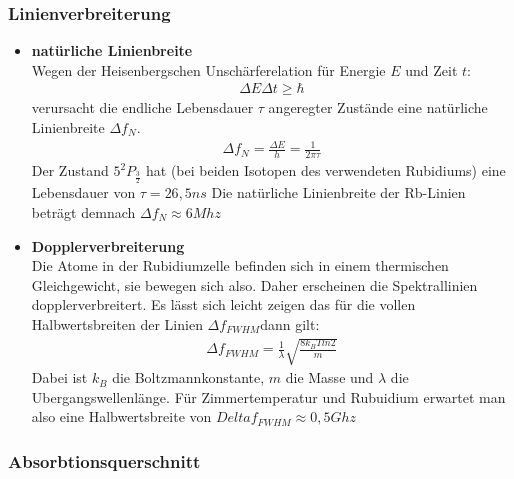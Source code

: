\documentclass[12pt]{article}
\begin{document}
\subsubsection{Linienverbreiterung}
\begin{itemize}
 \item \textbf{natürliche Linienbreite} \\
    Wegen der Heisenbergschen Unschärferelation für Energie $E$ und Zeit $t$:
    \begin{align*}
    \Delta E \Delta t \geq \hbar
    \end{align*}
    verursacht die endliche Lebensdauer $\tau$ angeregter Zustände eine natürliche Linienbreite $\Delta f_N$.
    \begin{align}
    \label{natbreite}
    \Delta f_N  = \frac{\Delta E}{h} = \frac{1}{2 \pi \tau}
    \end{align}
    Der Zustand $5^2P_{\frac{3}{2}}$ hat (bei beiden Isotopen des verwendeten Rubidiums) eine Lebensdauer von $\tau =26,5 ns$
    Die natürliche Linienbreite der Rb-Linien beträgt demnach $\Delta f_N \approx 6 Mhz$
 \item \textbf{Dopplerverbreiterung} \\
    Die Atome in der Rubidiumzelle befinden sich in einem thermischen Gleichgewicht, sie bewegen sich also. Daher erscheinen die Spektrallinien dopplerverbreitert. Es lässt sich leicht zeigen das für die vollen Halbwertsbreiten der Linien $\Delta f_{FWHM}$dann gilt:
    \begin{align}
    \label{FWHM}
     \Delta f_{FWHM} = \frac{1}{\lambda} \sqrt{\frac{8 k_B T ln 2}{m}}
    \end{align}
    Dabei ist $k_B$ die Boltzmannkonstante, $m$ die Masse und $\lambda$ die Ubergangswellenlänge.
Für Zimmertemperatur und Rubuidium erwartet man also eine Halbwertsbreite von $Delta f_{FWHM} \approx 0,5 Ghz$
\end{itemize}

\subsubsection{Absorbtionsquerschnitt}
\end{document}
